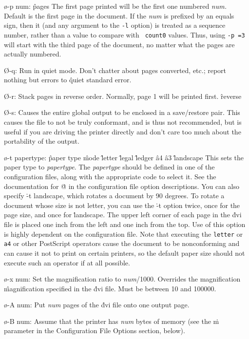 {\o-p num:
\^{pages}
The first page printed will be the first one numbered {\it num.}
Default is the first page in the document.  If the {\it num} is
prefixed by an equals sign, then it (and any argument to the
{\tt -l} option) is treated as a sequence number, rather than
a value to compare with {\tt {} count0} values.  Thus,
using {\tt -p =3} will start with the third page of the document,
no matter what the pages are actually numbered.

\O-q: Run in quiet mode.
Don't chatter about pages converted, etc.; report nothing but errors to
\^{quiet}
standard error.

\O-r:
Stack pages in reverse order.  Normally, page 1 will be printed first.
\^{reverse}

\O-s:
Causes the entire global output to be enclosed in a save/restore pair.
This causes the file to not be truly conformant, and is thus not recommended,
but is useful if you are driving the printer directly and don't care too
much about the portability of the output.

\o-t papertype:
\^{paper type}
\^{mode}
\^{letter}
\^{legal}
\^{ledger}
\^{a4}
\^{a3}
\^{landscape}
This sets the paper type to {\it papertype}.  The {\it papertype} should
be defined in one of the configuration files, along with the appropriate
code to select it.  See the documentation for \.@ in the configuration
file option descriptions.  You can also specify
\.{-t landscape}, which rotates a document by 90 degrees.
To rotate a document whose size is not letter, you can use the 
\.{-t} option twice, once for the page size, and once for \.{landscape}.
The upper left corner of each page in
the \.{dvi} file is placed one inch from the left and one inch from the top.
Use of this option is highly dependent on the configuration file.
Note that executing the {\tt letter} or {\tt a4} or other PostScript
operators cause the document to be nonconforming and can cause it not
to print on certain printers, so the default paper size should not
execute such an operator if at all possible.

\o-x num:
Set the magnification ratio to {\it num}/1000. Overrides the magnification
\^{magnification}
specified in the \.{dvi} file.  Must be between 10 and 100000.

\o-A num:
Put {\it num} pages of the \.{dvi} file onto one output page.

\o-B num:
Assume that the printer has {\it num} bytes of memory (see the \.{m} parameter
in the Configuration File Options section, below).

}
